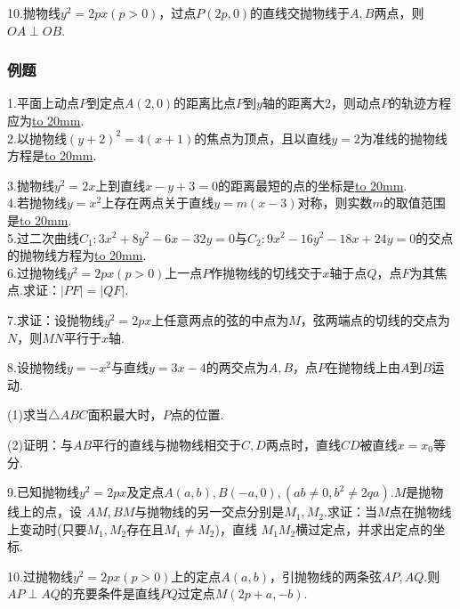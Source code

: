 10.抛物线$y^2=2px(p>0)$，过点$P(2p,0)$的直线交抛物线于$A,B$两点，则$OA\perp OB$.
~\\
\subsubsection{例题}

1.平面上动点$P$到定点$A(2,0)$的距离比点$P$到$y$轴的距离大2，则动点$P$的轨迹方程应为\underline{\hbox to 20mm{}}.
~\\

2.以抛物线$(y+2)^2=4(x+1)$的焦点为顶点，且以直线$y=2$为准线的抛物线方程是\underline{\hbox to 20mm{}}.
~\\

\newpage

3.抛物线$y^2=2x$上到直线$x-y+3=0$的距离最短的点的坐标是\underline{\hbox to 20mm{}}.
~\\

4.若抛物线$y=x^2$上存在两点关于直线$y=m(x-3)$对称，则实数$m$的取值范围是\underline{\hbox to 20mm{}}.
~\\

5.过二次曲线$C_1:3x^2+8y^2-6x-32y=0$与$C_2:9x^2-16y^2-18x+24y=0$的交点的抛物线方程为\underline{\hbox to 20mm{}}.
~\\

6.过抛物线$y^2=2px(p>0)$上一点$P$作抛物线的切线交于$x$轴于点$Q$，点$F$为其焦点.求证：$|PF|=|QF|$.
\vspace{40mm}

7.求证：设抛物线$y^2=2px$上任意两点的弦的中点为$M$，弦两端点的切线的交点为$N$，则$MN$平行于$x$轴.
\vspace{40mm}

8.设抛物线$y=-x^2$与直线$y=3x-4$的两交点为$A,B$，点$P$在抛物线上由$A$到$B$运动.

(1)求当$\bigtriangleup ABC$面积最大时，$P$点的位置.

(2)证明：与$AB$平行的直线与抛物线相交于$C,D$两点时，直线$CD$被直线$x=x_0$等分.

\vspace{50mm}

9.已知抛物线$y^2=2px$及定点$A(a,b),B(-a,0),(ab\neq 0,b^2\neq 2qa)$.$M$是抛物线上的点，设
$AM,BM$与抛物线的另一交点分别是$M_1,M_2$.求证：当$M$点在抛物线上变动时(只要$M_1,M_2$存在且$M_1\neq M_2$)，直线
$M_1M_2$横过定点，并求出定点的坐标.

\newpage

10.过抛物线$y^2=2px(p>0)$上的定点$A(a,b)$，引抛物线的两条弦$AP,AQ$.则
$AP\perp AQ$的充要条件是直线$PQ$过定点$M(2p+a,-b)$.
\vspace{50mm}

